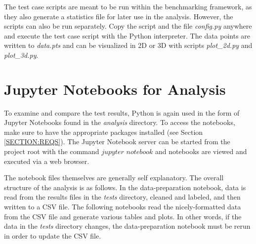 The test case scripts are meant to be run within the benchmarking framework, as they also generate a statistics file for later use in the analysis. However, the scripts can also be run separately. Copy the script and the file {\itshape config.py} anywhere and execute the test case script with the Python interpreter. The data points are written to {\itshape data.pts} and can be visualized in 2D or 3D with scripts {\itshape plot\_2d.py} and {\itshape plot\_3d.py}.

\section{Jupyter Notebooks for Analysis}
\label{SECTION:NOTEBOOKS}

To examine and compare the test results, Python is again used in the form of Jupyter Notebooks found in the {\itshape analysis} directory. To access the notebooks, make sure to have the appropriate packages installed (see Section \ref{SECTION:REQS}). The Jupyter Notebook server can be started from the project root with the command $jupyter$ $notebook$ and notebooks are viewed and executed via a web browser.

The notebook files themselves are generally self explanatory. The overall structure of the analysis is as follows. In the data-preparation notebook, data is read from the results files in the {\itshape tests} directory, cleaned and labeled, and then written to a CSV file. The following notebooks read the nicely-formatted data from the CSV file and generate various tables and plots. In other words, if the data in the {\itshape tests} directory changes, the data-preparation notebook must be rerun in order to update the CSV file.
